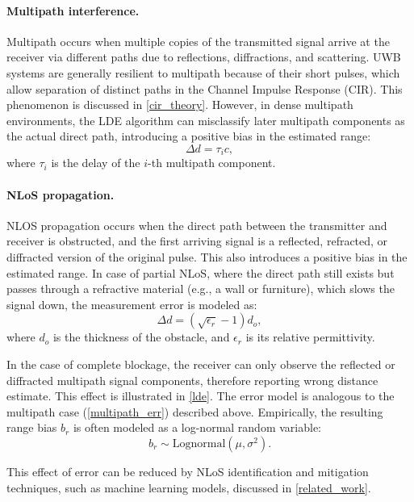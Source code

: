 \paragraph{Multipath interference.}
Multipath occurs when multiple copies of the transmitted signal arrive at the receiver via different paths due to reflections, diffractions, and scattering. UWB systems are generally resilient to multipath because of their short pulses, which allow separation of distinct paths in the Channel Impulse Response (CIR). This phenomenon is discussed in \autoref{cir_theory}. However, in dense multipath environments, the LDE algorithm can misclassify later multipath components as the actual direct path, introducing a positive bias in the estimated range:
\begin{equation}\label{multipath_err}
    \Delta d =  \tau_i c,
\end{equation}
where $\tau_i$ is the delay of the $i$-th multipath component.

\paragraph{NLoS propagation.}
NLOS propagation occurs when the direct path between the transmitter and receiver is obstructed, and the first arriving signal is a reflected, refracted, or diffracted version of the original pulse. This also introduces a positive bias in the estimated range. In case of partial NLoS, where the direct path still exists but passes through a refractive material (e.g., a wall or furniture), which slows the signal down, the measurement error is modeled as:
\begin{equation}
\Delta d = (\sqrt{\epsilon_r} - 1) d_o,
\end{equation}
where $d_o$ is the thickness of the obstacle, and $\epsilon_r$ is its relative permittivity. 

In the case of complete blockage, the receiver can only observe the reflected or diffracted multipath signal components, therefore reporting wrong distance estimate. This effect is illustrated in \autoref{lde}. The error model is analogous to the multipath case (\autoref{multipath_err}) described above. Empirically, the resulting range bias $b_r$ is often modeled as a log-normal random variable:
\begin{equation}
b_r \sim \text{Lognormal}(\mu, \sigma^2).
\end{equation}

This effect of error can be reduced by NLoS identification and mitigation techniques, such as machine learning models, discussed in \autoref{related_work}.

